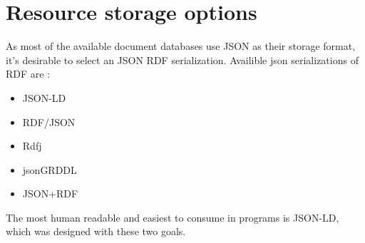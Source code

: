 
\section{Resource storage options}
As most of the available document databases use JSON as their storage format, it's desirable to select an JSON RDF serialization. Availible json serializations of RDF are \cite{onlineW3CRdfSyntax}:
\begin{itemize}
	\item JSON-LD
	\item RDF/JSON
	\item Rdfj
	\item jsonGRDDL
	\item JSON+RDF
\end{itemize}
The most human readable and easiest to consume in programs is JSON-LD, which was designed with these two goals. 

